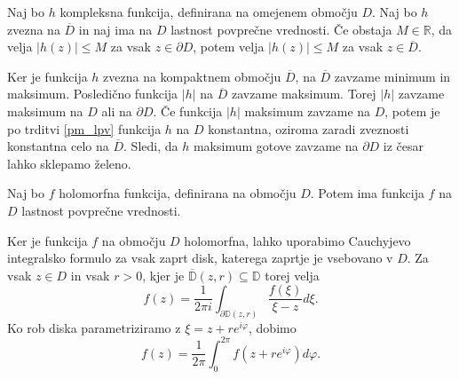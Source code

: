 \documentclass[mat1, tisk]{fmfdelo}
\begin{document}
    \begin{posledica}
        \label{posledica_pm_lpv}
        Naj bo $h$  kompleksna funkcija, definirana na omejenem območju $D$. Naj bo $h$ zvezna na $\overline{D}$ in naj ima na $D$ lastnost povprečne vrednosti. 
        Če obstaja $M \in \mathbb{R}$, da velja $|h(z)| \leq M$ za vsak $z \in \partial D$, potem velja $|h(z)| \leq M$ za vsak $z \in \overline{D}$. 
    \end{posledica}
    \begin{dokaz}
        Ker je funkcija $h$ zvezna na kompaktnem območju $\overline{D}$, na $\overline{D}$ zavzame minimum in maksimum. Posledično funkcija $|h|$ na $\overline{D}$ zavzame maksimum. 
        Torej $|h|$ zavzame maksimum na $D$ ali na $\partial D$. Če funkcija $|h|$ maksimum zavzame na $D$, potem je po trditvi \ref{pm_lpv} funkcija $h$ na $D$ konstantna, oziroma zaradi zveznosti konstantna celo na $\overline{D}$. 
        Sledi, da $h$ maksimum gotove zavzame na $\partial D$ iz česar lahko sklepamo želeno.
    \end{dokaz}

    \begin{trditev}
        \label{hol_lpv}
        Naj bo $f$ holomorfna funkcija, definirana na območju $D$. Potem ima funkcija $f$ na $D$ lastnost povprečne vrednosti.
    \end{trditev}
    \begin{dokaz}
        Ker je funkcija $f$ na območju $D$ holomorfna, lahko uporabimo Cauchyjevo integralsko formulo za vsak zaprt disk, katerega zaprtje je vsebovano v $D$. Za vsak $z \in D$ in vsak $r > 0$, kjer je $\overline{\mathbb{D}}(z,r) \subseteq \mathbb{D}$ torej velja
        $$
        f(z) = \frac{1}{2 \pi i} \int_{\partial \mathbb{D}(z, r)}{\frac{f(\xi)}{\xi  - z}}d\xi.
        $$
        Ko rob diska parametriziramo z $\xi = z + r e^{i \varphi}$, dobimo
        $$
        f(z) = \frac{1}{2 \pi} \int_{0}^{2\pi}{f(z + re^{i\varphi})}d\varphi.
        $$
    \end{dokaz}
\end{document}
